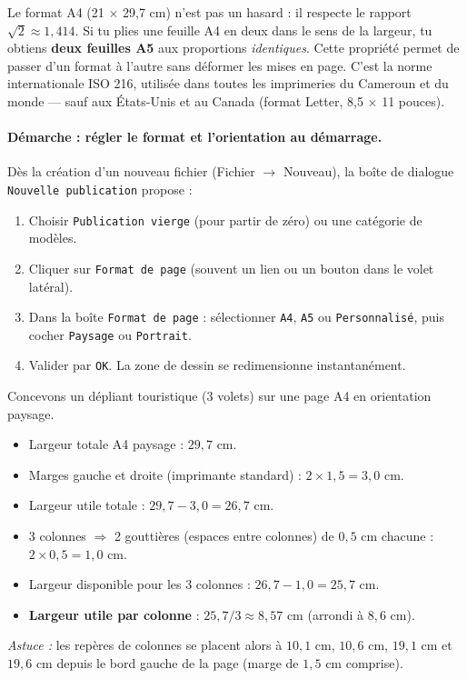 \documentclass[11pt]{article}
\begin{document}
\begin{savaistu}
Le format A4 (21 $\times$ 29,7 cm) n'est pas un hasard : il respecte le rapport $\sqrt{2} \approx 1,414$. Si tu plies une feuille A4 en deux dans le sens de la largeur, tu obtiens \textbf{deux feuilles A5} aux proportions \emph{identiques}. Cette propriété permet de passer d'un format à l'autre sans déformer les mises en page. C'est la norme internationale ISO 216, utilisée dans toutes les imprimeries du Cameroun et du monde — sauf aux États-Unis et au Canada (format Letter, 8,5 $\times$ 11 pouces).
\end{savaistu}

\paragraph{Démarche : régler le format et l'orientation au démarrage.}
Dès la création d'un nouveau fichier (Fichier $\rightarrow$ Nouveau), la boîte de dialogue \texttt{Nouvelle publication} propose :
\begin{enumerate}
    \item Choisir \texttt{Publication vierge} (pour partir de zéro) ou une catégorie de modèles.
    \item Cliquer sur \texttt{Format de page} (souvent un lien ou un bouton dans le volet latéral).
    \item Dans la boîte \texttt{Format de page} : sélectionner \texttt{A4}, \texttt{A5} ou \texttt{Personnalisé}, puis cocher \texttt{Paysage} ou \texttt{Portrait}.
    \item Valider par \texttt{OK}. La zone de dessin se redimensionne instantanément.
\end{enumerate}

\begin{exemplebox}
Concevons un dépliant touristique (3 volets) sur une page A4 en orientation paysage.
\begin{itemize}
    \item Largeur totale A4 paysage : $29,7$ cm.
    \item Marges gauche et droite (imprimante standard) : $2 \times 1,5 = 3,0$ cm.
    \item Largeur utile totale : $29,7 - 3,0 = 26,7$ cm.
    \item 3 colonnes $\Rightarrow$ 2 gouttières (espaces entre colonnes) de $0,5$ cm chacune : $2 \times 0,5 = 1,0$ cm.
    \item Largeur disponible pour les 3 colonnes : $26,7 - 1,0 = 25,7$ cm.
    \item \textbf{Largeur utile par colonne} : $25,7 / 3 \approx 8,57$ cm (arrondi à $8,6$ cm).
\end{itemize}
\emph{Astuce :} les repères de colonnes se placent alors à $10,1$ cm, $10,6$ cm, $19,1$ cm et $19,6$ cm depuis le bord gauche de la page (marge de $1,5$ cm comprise).
\end{exemplebox}
\end{document}
